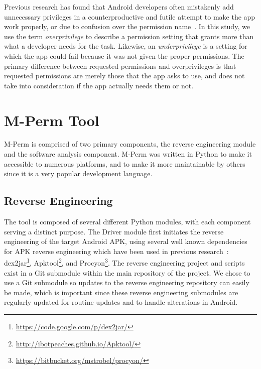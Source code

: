 \documentclass{sig-alternate-05-2015}
\newcommand{\todo}[1]{\textcolor{cyan}{\textbf{[#1]}}}
\begin{document}
Previous research has found that Android developers often mistakenly add unnecessary privileges in a counterproductive and futile attempt to make the app work properly, or due to confusion over the permission name~\cite{Felt:2011:APD:2046707.2046779}. In this study, we use the term \emph{overprivilege} to describe a permission setting that grants more than what a developer needs for the task. Likewise, an \emph{underprivilege} is a setting for which the app could fail because it was not given the proper permissions. The primary difference between requested permissions and overprivileges is that requested permissions are merely those that the app asks to use, and does not take into consideration if the app actually needs them or not.



\section{M-Perm Tool}
\label{sec:MPerm}

M-Perm is comprised of two primary components, the reverse engineering module and the software analysis component. M-Perm was written in Python to make it accessible to numerous platforms, and to make it more maintainable by others since it is a very popular development language.

\subsection{Reverse Engineering}

The tool is composed of several different Python modules, with each component serving a distinct purpose. The Driver module first initiates the reverse engineering of the target Android APK, using several well known dependencies for APK reverse engineering which have been used in previous research~\cite{Lee_2013,6687155}: dex2jar\footnote{\url{https://code.google.com/p/dex2jar/}}, Apktool\footnote{\url{http://ibotpeaches.github.io/Apktool/}}, and Procyon\footnote{\url{https://bitbucket.org/mstrobel/procyon/}}. The reverse engineering project and scripts exist in a Git submodule within the main repository of the project. We chose to use a Git submodule so updates to the reverse engineering repository can easily be made, which is important since these reverse engineering submodules are regularly updated for routine updates and to handle alterations in Android.
\end{document}
